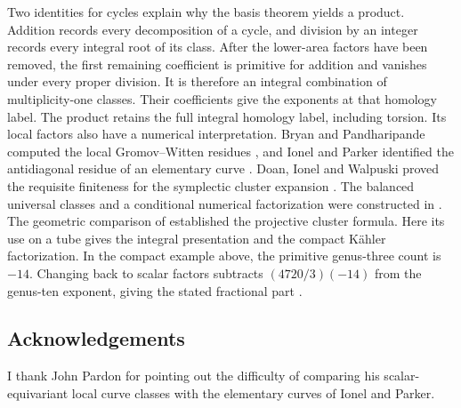 Two identities for cycles explain why the basis theorem yields a
product. Addition records every decomposition of a cycle, and division
by an integer records every integral root of its class. After the
lower-area factors have been removed, the first remaining coefficient
is primitive for addition and vanishes under every proper division.
It is therefore an integral combination of multiplicity-one classes.
Their coefficients give the exponents at that homology label.
The product retains the full integral homology label, including
torsion. Its local factors also have a numerical interpretation.
Bryan and Pandharipande computed the local Gromov--Witten residues
\cite{BP}, and Ionel and Parker identified the antidiagonal residue of an
elementary curve \cite[Proposition~3.3]{IP}. Doan, Ionel and Walpuski
proved the requisite finiteness for the symplectic cluster expansion
\cite{DIW}. The balanced universal classes and a conditional numerical
factorization were constructed in \cite{WueBalanced}. The geometric
comparison of \cite{WueProduct} established the projective cluster
formula. Here its use on a tube gives the integral presentation and
the compact Kähler factorization. In the compact example above, the
primitive genus-three count is $-14$. Changing back to scalar factors
subtracts $(4720/3)(-14)$ from the genus-ten exponent, giving the stated
fractional part \cite{WueCounter,WueTriples}.

\subsection*{Acknowledgements}
I thank John Pardon for pointing out the difficulty of comparing his
scalar-equivariant local curve classes with the elementary curves of
Ionel and Parker.
